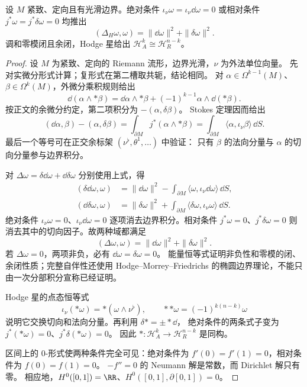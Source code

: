 \begin{proposition}
设 $M$ 紧致、定向且有光滑边界。绝对条件 $\iota_\nu\omega=\iota_\nu\dd\omega=0$ 或相对条件 $j^*\omega=j^*\delta\omega=0$ 均推出\[(\Delta_H\omega,\omega)=\|\dd\omega\|^2+\|\delta\omega\|^2.\]调和零模闭且余闭，Hodge 星给出 $\mathcal H_A^k\cong\mathcal H_R^{n-k}$。
\end{proposition}

\begin{proof}
设 $M$ 为紧致、定向的 Riemann 流形，边界光滑，$\nu$ 为外法单位向量。
先对实微分形式计算；复形式在第二槽取共轭，结论相同。
对 $\alpha\in\Omega^{k-1}(M)$、$\beta\in\Omega^k(M)$，外微分乘积规则给出
\[
\dd(\alpha\wedge *\beta)
=\dd\alpha\wedge *\beta+(-1)^{k-1}\alpha\wedge\dd(*\beta).
\]
按正文的余微分约定，第二项积分为 $-(\alpha,\delta\beta)$。
Stokes 定理因而给出
\[
(\dd\alpha,\beta)-(\alpha,\delta\beta)
=\int_{\partial M}j^*(\alpha\wedge *\beta)
=\int_{\partial M}\langle\alpha,\iota_\nu\beta\rangle\,\dd S.
\]
最后一个等号可在正交余标架 $(\nu^\flat,\theta^1,\dots)$ 中验证：
只有 $\beta$ 的法向分量与 $\alpha$ 的切向分量参与边界积分。

对 $\Delta\omega=\delta\dd\omega+\dd\delta\omega$ 分别使用上式，得
\begin{align*}
(\delta\dd\omega,\omega)
&=\|\dd\omega\|^2-
\int_{\partial M}\langle\omega,\iota_\nu\dd\omega\rangle\,\dd S,\\
(\dd\delta\omega,\omega)
&=\|\delta\omega\|^2+
\int_{\partial M}\langle\delta\omega,\iota_\nu\omega\rangle\,\dd S.
\end{align*}
绝对条件 $\iota_\nu\omega=0$、$\iota_\nu\dd\omega=0$
逐项消去边界积分。相对条件 $j^*\omega=0$、$j^*\delta\omega=0$
则消去其中的切向因子。故两种域都满足
\[
(\Delta\omega,\omega)=\|\dd\omega\|^2+\|\delta\omega\|^2.
\]
若 $\Delta\omega=0$，两项非负，必有 $\dd\omega=\delta\omega=0$。
能量恒等式证明非负性和零模的闭、余闭性质；完整自伴性还使用
Hodge--Morrey--Friedrichs 的椭圆边界理论，不能只由一次分部积分宣称已经证明。

Hodge 星的点态恒等式
\[
\iota_\nu(*\omega)=*(\omega\wedge\nu^\flat),\qquad
**\omega=(-1)^{k(n-k)}\omega
\]
说明它交换切向和法向分量。再利用 $\delta*=\pm*\dd$，
绝对条件的两条式子变为 $j^*(*\omega)=0$、$j^*\delta(*\omega)=0$。
因此 $*:\mathcal H_A^k\to\mathcal H_R^{n-k}$ 是同构。

区间上的 $0$-形式使两种条件完全可见：绝对条件为
$f'(0)=f'(1)=0$，相对条件为 $f(0)=f(1)=0$。
$-f''=0$ 的 Neumann 解是常数，而 Dirichlet 解只有零。
相应地，$H^0([0,1])=\RR$、$H^0([0,1],\partial[0,1])=0$。


\end{proof}
